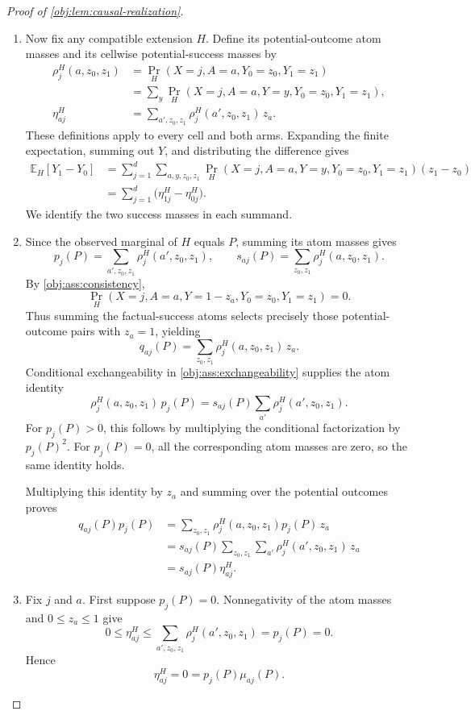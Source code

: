 \documentclass[11pt]{article}
\begin{document}
\begin{proof}[Proof of \cref{obj:lem:causal-realization}]
\begin{enumerate}
\item
Now fix any compatible extension \(H\). Define its potential-outcome
atom masses and its cellwise potential-success masses by
\[
\begin{aligned}
\rho^H_j(a,z_0,z_1)
&=\Pr_H(X=j,A=a,Y_0=z_0,Y_1=z_1)\\
&=\sum_y\Pr_H(X=j,A=a,Y=y,Y_0=z_0,Y_1=z_1),\\
\eta^H_{aj}
&=\sum_{a',z_0,z_1}\rho^H_j(a',z_0,z_1)\,z_a.
\end{aligned}
\]
These definitions apply to every cell and both arms. Expanding the
finite expectation, summing out \(Y\), and distributing the
difference gives
\[
\begin{aligned}
\mathbb E_H[Y_1-Y_0]
&=\sum_{j=1}^{d}\sum_{a,y,z_0,z_1}
 \Pr_H(X=j,A=a,Y=y,Y_0=z_0,Y_1=z_1)(z_1-z_0)\\
&=\sum_{j=1}^{d}\bigl(\eta^H_{1j}-\eta^H_{0j}\bigr).
\end{aligned}
\]
We identify the two success masses in each summand.

\item
Since the observed marginal of \(H\) equals \(P\), summing its atom
masses gives
\[
p_j(P)=\sum_{a',z_0,z_1}\rho^H_j(a',z_0,z_1),
\qquad
s_{aj}(P)=\sum_{z_0,z_1}\rho^H_j(a,z_0,z_1).
\]
By \cref{obj:ass:consistency},
\[
\Pr_H(X=j,A=a,Y=1-z_a,Y_0=z_0,Y_1=z_1)=0.
\]
Thus summing the factual-success atoms selects precisely those
potential-outcome pairs with \(z_a=1\), yielding
\[
q_{aj}(P)=\sum_{z_0,z_1}\rho^H_j(a,z_0,z_1)\,z_a.
\]
Conditional exchangeability in
\cref{obj:ass:exchangeability} supplies the atom identity
\[
\rho^H_j(a,z_0,z_1)\,p_j(P)
=
s_{aj}(P)\sum_{a'}\rho^H_j(a',z_0,z_1).
\]
For \(p_j(P)>0\), this follows by multiplying the conditional
factorization by \(p_j(P)^2\). For \(p_j(P)=0\), all the corresponding
atom masses are zero, so the same identity holds.

Multiplying this identity by \(z_a\) and summing over the potential
outcomes proves
\[
\begin{aligned}
q_{aj}(P)p_j(P)
&=\sum_{z_0,z_1}
 \rho^H_j(a,z_0,z_1)p_j(P)\,z_a\\
&=s_{aj}(P)\sum_{z_0,z_1}\sum_{a'}
 \rho^H_j(a',z_0,z_1)\,z_a\\
&=s_{aj}(P)\eta^H_{aj}.
\end{aligned}
\]

\item
Fix \(j\) and \(a\). First suppose \(p_j(P)=0\).
Nonnegativity of the atom masses and \(0\le z_a\le1\) give
\[
0\le\eta^H_{aj}
\le\sum_{a',z_0,z_1}\rho^H_j(a',z_0,z_1)
=p_j(P)=0.
\]
Hence
\[
\eta^H_{aj}=0=p_j(P)\mu_{aj}(P).
\]


\end{enumerate}
\end{proof}
\end{document}
